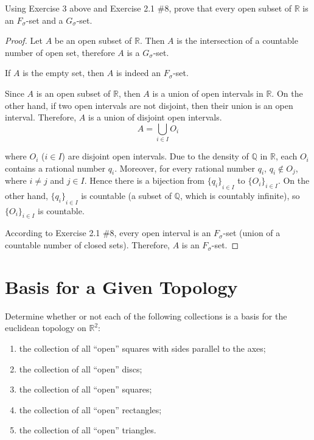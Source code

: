 \begin{exercise}
	Using Exercise 3 above and Exercise 2.1 \#8, prove that every open subset of $\mathbb{R}$ is an $F_{\sigma}$-set and a $G_{\sigma}$-set.
\end{exercise}

\begin{proof}
	Let $A$ be an open subset of $\mathbb{R}$. Then $A$ is the intersection of a countable number of open set, therefore $A$ is a $G_{\sigma}$-set.

	If $A$ is the empty set, then $A$ is indeed an $F_{\sigma}$-set.

	Since $A$ is an open subset of $\mathbb{R}$, then $A$ is a union of open intervals in $\mathbb{R}$. On the other hand, if two open intervals are not disjoint, then their union is an open interval. Therefore, $A$ is a union of disjoint open intervals.
	\[
		A = \bigcup_{i\in I} O_{i}
	\]

	where $O_{i}$ ($i\in I$) are disjoint open intervals. Due to the density of $\mathbb{Q}$ in $\mathbb{R}$, each $O_{i}$ contains a rational number $q_{i}$. Moreover, for every rational number $q_{i}$, $q_{i}\notin O_{j}$, where $i\ne j$ and $j\in I$. Hence there is a bijection from ${\{ q_{i} \}}_{i\in I}$ to ${\{ O_{i} \}}_{i\in I}$. On the other hand, ${\{ q_{i} \}}_{i\in I}$ is countable (a subset of $\mathbb{Q}$, which is countably infinite), so ${\{ O_{i} \}}_{i\in I}$ is countable.

	According to Exercise 2.1 \#8, every open interval is an $F_{\sigma}$-set (union of a countable number of closed sets). Therefore, $A$ is an $F_{\sigma}$-set.
\end{proof}
\newpage

\section{Basis for a Given Topology}

\begin{exercise}
	Determine whether or not each of the following collections is a basis for the euclidean topology on $\mathbb{R}^{2}$:
	\begin{enumerate}[label={(\roman*)}]
		\item the collection of all ``open'' squares with sides parallel to the axes;
		\item the collection of all ``open'' discs;
		\item the collection of all ``open'' squares;
		\item the collection of all ``open'' rectangles;
		\item the collection of all ``open'' triangles.
	\end{enumerate}
\end{exercise}

